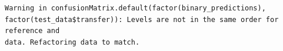 \documentclass[
  letterpaper,
  DIV=11,
  numbers=noendperiod]{scrartcl}
\newenvironment{Shaded}{\begin{snugshade}}{\end{snugshade}}
\newcommand{\CommentTok}[1]{\textcolor[rgb]{0.37,0.37,0.37}{#1}}
\newcommand{\DecValTok}[1]{\textcolor[rgb]{0.68,0.00,0.00}{#1}}
\newcommand{\FloatTok}[1]{\textcolor[rgb]{0.68,0.00,0.00}{#1}}
\newcommand{\FunctionTok}[1]{\textcolor[rgb]{0.28,0.35,0.67}{#1}}
\newcommand{\NormalTok}[1]{\textcolor[rgb]{0.00,0.23,0.31}{#1}}
\newcommand{\OtherTok}[1]{\textcolor[rgb]{0.00,0.23,0.31}{#1}}
\newcommand{\SpecialCharTok}[1]{\textcolor[rgb]{0.37,0.37,0.37}{#1}}
\begin{document}
\begin{Shaded}
\end{Shaded}

\begin{verbatim}
Warning in confusionMatrix.default(factor(binary_predictions),
factor(test_data$transfer)): Levels are not in the same order for reference and
data. Refactoring data to match.
\end{verbatim}
\end{document}
